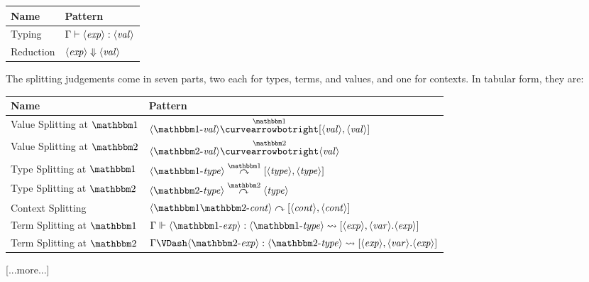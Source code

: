 \documentclass{article}
\begin{document}
\begin{center}
\begin{tabular}{|l|l|} \hline
Name & Pattern \\ \hline
Typing & ${\Gamma} \vdash {\langle\mathit{exp}\rangle}:{\langle\mathit{val}\rangle}$ \\  \hline
Reduction & ${\langle\mathit{exp}\rangle} \Downarrow {\langle\mathit{val}\rangle}$ \\ \hline
\end{tabular}
\end{center}

The splitting judgements come in seven parts, two each for types, terms, and values, and one for contexts.  In tabular form, they are:
\begin{center}
\begin{tabular}{|l|l|} \hline
Name & Pattern \\ \hline
Value Splitting at $\bbone$& $\valo \vsplito [\val,\val]$ \\  \hline
Value Splitting at $\bbtwo$& $\valt \vsplits \val$ \\  \hline
Type Splitting at $\bbone$& $\typeo \tsplito [\type,\type]$ \\  \hline
Type Splitting at $\bbtwo$& $\typet \tsplits \type$ \\  \hline
Context Splitting & $\contextot \csplit [\context,\context]$ \\  \hline
Term Splitting at $\bbone$& $\splitone{\expro}{\typeo}{\expr,\var.\expr}$ \\  \hline
Term Splitting at $\bbtwo$& $\splittwo{\exprt}{\typet}{\expr,\var.\expr}$ \\  \hline
\end{tabular}
\end{center}

[...more...]
\end{document}
